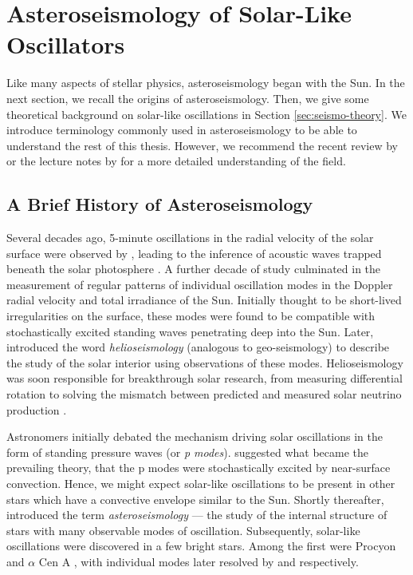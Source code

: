 \section[Solar-Like Oscillators]{Asteroseismology of Solar-Like Oscillators}\label{sec:seismo}

Like many aspects of stellar physics, asteroseismology began with the Sun. In the next section, we recall the origins of asteroseismology. Then, we give some theoretical background on solar-like oscillations in Section \ref{sec:seismo-theory}. We introduce terminology commonly used in asteroseismology to be able to understand the rest of this thesis. However, we recommend the recent review by \citet{Aerts2021} or the lecture notes by \citet{Christensen-Dalsgaard2014} for a more detailed understanding of the field.

\subsection{A Brief History of Asteroseismology}

Several decades ago, 5-minute oscillations in the radial velocity of the solar surface were observed by \citet{Leighton.Noyes.ea1962}, leading to the inference of acoustic waves trapped beneath the solar photosphere \citep{Ulrich1970}. A further decade of study culminated in the measurement of regular patterns of individual oscillation modes in the Doppler radial velocity \citep{Claverie.Isaak.ea1979} and total irradiance \citep{Woodard.Hudson1983a} of the Sun. Initially thought to be short-lived irregularities on the surface, these modes were found to be compatible with stochastically excited standing waves penetrating deep into the Sun. Later, \citet{Deubner.Gough1984} introduced the word \emph{helioseismology} (analogous to geo-seismology) to describe the study of the solar interior using observations of these modes. Helioseismology was soon responsible for breakthrough solar research, from measuring differential rotation \citep{Deubner.Ulrich.ea1979} to solving the mismatch between predicted and measured solar neutrino production \citep{Bahcall.Ulrich1988}.

Astronomers initially debated the mechanism driving solar oscillations in the form of standing pressure waves (or \emph{p modes}). \citet{Goldreich.Keeley1977} suggested what became the prevailing theory, that the p modes were stochastically excited by near-surface convection. Hence, we might expect solar-like oscillations to be present in other stars which have a convective envelope similar to the Sun. Shortly thereafter, \citet{Christensen-Dalsgaard1984} introduced the term \emph{asteroseismology} --- the study of the internal structure of stars with many observable modes of oscillation. Subsequently, solar-like oscillations were discovered in a few bright stars. Among the first were Procyon and \(\alpha\) Cen A \citep{Gelly.Grec.ea1986}, with individual modes later resolved by \citet{Martic.Schmitt.ea1999} and \citet{Bouchy.Carrier2001} respectively.

